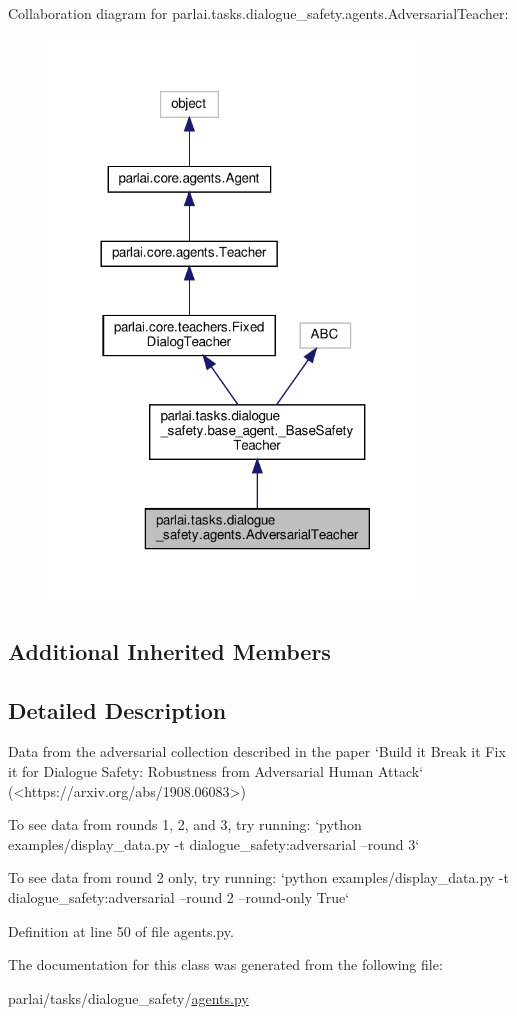 Collaboration diagram for parlai.\+tasks.\+dialogue\+\_\+safety.\+agents.\+Adversarial\+Teacher\+:\nopagebreak
\begin{figure}[H]
\begin{center}
\leavevmode
\includegraphics[width=281pt]{d8/d5c/classparlai_1_1tasks_1_1dialogue__safety_1_1agents_1_1AdversarialTeacher__coll__graph}
\end{center}
\end{figure}
\subsection*{Additional Inherited Members}


\subsection{Detailed Description}
\begin{DoxyVerb}Data from the adversarial collection described in the paper `Build it Break it Fix
it for Dialogue Safety: Robustness from Adversarial Human Attack`
(<https://arxiv.org/abs/1908.06083>)

To see data from rounds 1, 2, and 3, try running:
`python examples/display_data.py -t dialogue_safety:adversarial --round 3`

To see data from round 2 only, try running:
`python examples/display_data.py -t dialogue_safety:adversarial --round 2
 --round-only True`
\end{DoxyVerb}
 

Definition at line 50 of file agents.\+py.



The documentation for this class was generated from the following file\+:\begin{DoxyCompactItemize}
\item 
parlai/tasks/dialogue\+\_\+safety/\hyperlink{parlai_2tasks_2dialogue__safety_2agents_8py}{agents.\+py}\end{DoxyCompactItemize}
